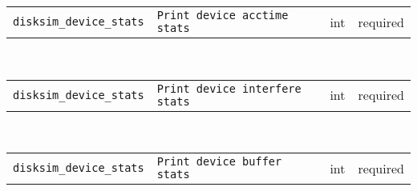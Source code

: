 \noindent 
\begin{tabular}{|p{1.5in}|p{3.5in}|p{0.5in}|p{0.5in}|}
\cline{1-4}
\texttt{disksim\_device\_stats} & \texttt{Print device acctime stats} & int & required \\ 
\cline{1-4}
\end{tabular}\\ 
\noindent 
\begin{tabular}{|p{1.5in}|p{3.5in}|p{0.5in}|p{0.5in}|}
\cline{1-4}
\texttt{disksim\_device\_stats} & \texttt{Print device interfere stats} & int & required \\ 
\cline{1-4}
\end{tabular}\\ 
\noindent 
\begin{tabular}{|p{1.5in}|p{3.5in}|p{0.5in}|p{0.5in}|}
\cline{1-4}
\texttt{disksim\_device\_stats} & \texttt{Print device buffer stats} & int & required \\ 
\cline{1-4}
\end{tabular}\\ 
